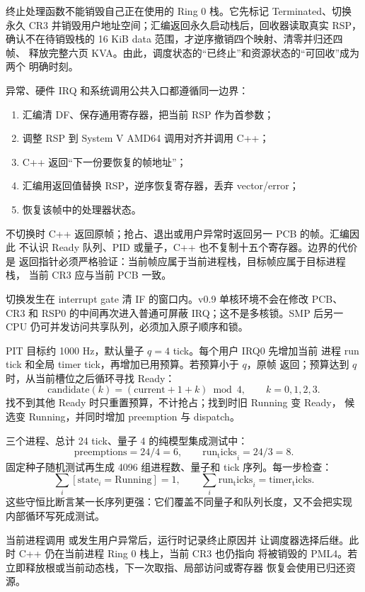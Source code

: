 终止处理函数不能销毁自己正在使用的 Ring 0 栈。它先标记 Terminated、切换
永久 CR3 并销毁用户地址空间；汇编返回永久启动栈后，回收器读取真实 RSP，
确认不在待销毁栈的 16 KiB data 范围，才逆序撤销四个映射、清零并归还四帧、
释放完整六页 KVA。由此，调度状态的“已终止”和资源状态的“可回收”成为两个
明确时刻。

异常、硬件 IRQ 和系统调用公共入口都遵循同一边界：

\begin{enumerate}[label=\arabic*.]
  \item 汇编清 DF、保存通用寄存器，把当前 RSP 作为首参数；
  \item 调整 RSP 到 System V AMD64 调用对齐并调用 C++；
  \item C++ 返回“下一份要恢复的帧地址”；
  \item 汇编用返回值替换 RSP，逆序恢复寄存器，丢弃 vector/error；
  \item {} 恢复该帧中的处理器状态。
\end{enumerate}

不切换时 C++ 返回原帧；抢占、退出或用户异常时返回另一 PCB 的帧。汇编因此
不认识 Ready 队列、PID 或量子，C++ 也不复制十五个寄存器。边界的代价是
返回指针必须严格验证：当前帧应属于当前进程栈，目标帧应属于目标进程栈，
当前 CR3 应与当前 PCB 一致。

切换发生在 interrupt gate 清 IF 的窗口内。v0.9 单核环境不会在修改 PCB、
CR3 和 RSP0 的中间再次进入普通可屏蔽 IRQ；这不是多核锁。SMP 后另一 CPU
仍可并发访问共享队列，必须加入原子顺序和锁。

PIT 目标约 1000 Hz，默认量子 \(q=4\) tick。每个用户 IRQ0 先增加当前
进程 run tick 和全局 timer tick，再增加已用预算。若预算小于 \(q\)，原帧
返回；预算达到 \(q\) 时，从当前槽位之后循环寻找 Ready：
\[
  \mathrm{candidate}(k) =
  (\mathrm{current}+1+k)\bmod 4,\qquad k=0,1,2,3.
\]
找不到其他 Ready 时只重置预算，不计抢占；找到时旧 Running 变 Ready，
候选变 Running，并同时增加 preemption 与 dispatch。

三个进程、总计 24 tick、量子 4 的纯模型集成测试中：
\[
  \mathrm{preemptions}=24/4=6,\qquad
  \mathrm{run_ticks}_i=24/3=8.
\]
固定种子随机测试再生成 4096 组进程数、量子和 tick 序列。每一步检查：
\[
  \sum_i [\mathrm{state}_i=\mathrm{Running}] = 1,\qquad
  \sum_i \mathrm{run_ticks}_i = \mathrm{timer_ticks}.
\]
这些守恒比断言某一长序列更强：它们覆盖不同量子和队列长度，又不会把实现
内部循环写死成测试。

当前进程调用  或发生用户异常后，运行时记录终止原因并
让调度器选择后继。此时 C++ 仍在当前进程 Ring 0 栈上，当前 CR3 也仍指向
将被销毁的 PML4。若立即释放根或当前动态栈，下一次取指、局部访问或寄存器
恢复会使用已归还资源。

